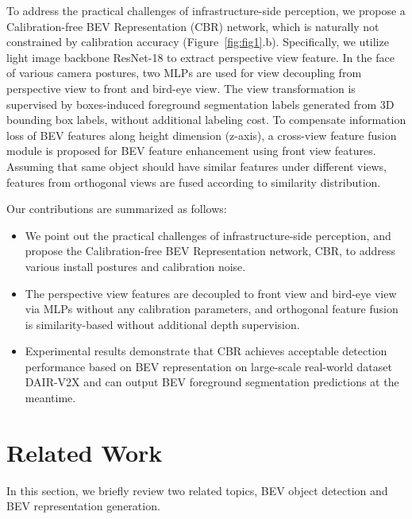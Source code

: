 \documentclass[letterpaper, 10 pt, conference]{ieeeconf}
\begin{document}
To address the practical challenges of infrastructure-side perception, we propose a Calibration-free BEV Representation (CBR) network, which is naturally not constrained by calibration accuracy (Figure~\ref{fig:fig1}.b). Specifically, we utilize light image backbone ResNet-18 to extract perspective view feature. In the face of various camera postures, two MLPs are used for view decoupling from perspective view to front and bird-eye view. The view transformation is supervised by boxes-induced foreground segmentation labels generated from 3D bounding box labels, without additional labeling cost. To compensate information loss of BEV features along height dimension (z-axis), a cross-view feature fusion module is proposed for BEV feature enhancement using front view features. Assuming that same object should have similar features under different views, features from  orthogonal views are fused according to similarity distribution. 

Our contributions are summarized as follows:
\begin{itemize}
  \setlength{\itemsep}{0pt}
  \setlength{\parsep}{0pt}
  \setlength{\parskip}{0pt}
  \item We point out the practical challenges of infrastructure-side perception, and propose the Calibration-free BEV Representation network, CBR, to address various install postures and calibration noise. 
  \item The perspective view features are decoupled to front view and bird-eye view via MLPs without any calibration parameters, and orthogonal feature fusion is similarity-based without additional depth supervision.
  \item Experimental results demonstrate that CBR achieves acceptable detection performance based on BEV representation on large-scale real-world dataset DAIR-V2X and can output BEV foreground segmentation predictions at the meantime.
\end{itemize}

\section{Related Work}
In this section, we briefly review two related topics, BEV object detection and BEV representation generation.
\end{document}
